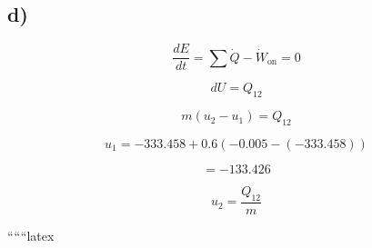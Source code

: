 

\subsection*{d)}
\[
\frac{dE}{dt} = \sum \dot{Q} - \dot{W}_{\text{on}} = 0
\]

\[
dU = Q_{12}
\]

\[
m(u_2 - u_1) = Q_{12}
\]

\[
u_1 = -333.458 + 0.6 \left( -0.005 - (-333.458) \right)
\]

\[
= -133.426
\]

\[
u_2 = \frac{Q_{12}}{m}
\]

``````latex